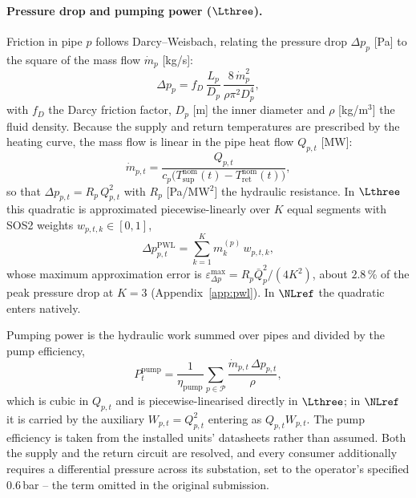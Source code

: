\paragraph{Pressure drop and pumping power ($\Lthree$).}
Friction in pipe $p$ follows Darcy--Weisbach, relating the pressure drop $\Delta p_p$ [Pa]
to the square of the mass flow $\dot{m}_p$ [kg/s]:
%
\begin{equation}
  \Delta p_{p} = f_D\, \frac{L_p}{D_p}\,
    \frac{8\,\dot{m}_p^2}{\rho \pi^2 D_p^4},
  \label{eq:darcy}
\end{equation}
%
with $f_D$ the Darcy friction factor, $D_p$ [m] the inner diameter and $\rho$ [kg/m$^3$]
the fluid density. Because the supply and return temperatures are prescribed by the
heating curve, the mass flow is linear in the pipe heat flow $Q_{p,t}$ [MW]:
%
\begin{equation}
  \dot{m}_{p,t} = \frac{Q_{p,t}}{
    c_p \bigl(T_{\mathrm{sup}}^{\mathrm{nom}}(t)
    - T_{\mathrm{ret}}^{\mathrm{nom}}(t)\bigr)},
  \label{eq:massflow}
\end{equation}
%
so that $\Delta p_{p,t} = R_p\, Q_{p,t}^2$ with $R_p$ [Pa/MW$^2$] the hydraulic
resistance. In $\Lthree$ this quadratic is approximated piecewise-linearly over $K$ equal
segments with SOS2 weights $w_{p,t,k} \in [0,1]$,
%
\begin{equation}
  \Delta p_{p,t}^{\mathrm{PWL}} = \sum_{k=1}^{K}
    m_k^{(p)}\, w_{p,t,k},
  \label{eq:pressure_pwl}
\end{equation}
%
whose maximum approximation error is
$\varepsilon^{\max}_{\Delta p} = R_p \bar{Q}_p^2 / (4K^2)$, about $2.8$\,\% of the peak
pressure drop at $K = 3$ (Appendix~\ref{app:pwl}). In $\NLref$ the quadratic enters
natively.

Pumping power is the hydraulic work summed over pipes and divided by the pump efficiency,
%
\begin{equation}
  P_t^{\mathrm{pump}} = \frac{1}{\eta_{\mathrm{pump}}}
    \sum_{p \in \mathcal{P}}
    \frac{\dot{m}_{p,t}\, \Delta p_{p,t}}{\rho},
  \label{eq:pump_power}
\end{equation}
%
which is cubic in $Q_{p,t}$ and is piecewise-linearised directly in $\Lthree$; in $\NLref$
it is carried by the auxiliary $W_{p,t} = Q_{p,t}^2$ entering as $Q_{p,t} W_{p,t}$. The
pump efficiency is taken from the installed units' datasheets rather than assumed. Both
the supply and the return circuit are resolved, and every consumer additionally requires a
differential pressure across its substation, set to the operator's specified $0.6$\,bar --
the term omitted in the original submission.

